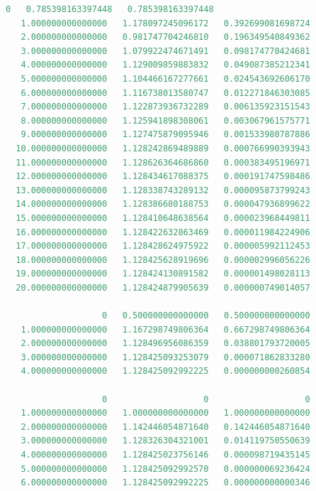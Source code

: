 \begin{lstlisting}[language = MATLAB]
                   0   0.785398163397448   0.785398163397448
   1.000000000000000   1.178097245096172   0.392699081698724
   2.000000000000000   0.981747704246810   0.196349540849362
   3.000000000000000   1.079922474671491   0.098174770424681
   4.000000000000000   1.129009859883832   0.049087385212341
   5.000000000000000   1.104466167277661   0.024543692606170
   6.000000000000000   1.116738013580747   0.012271846303085
   7.000000000000000   1.122873936732289   0.006135923151543
   8.000000000000000   1.125941898308061   0.003067961575771
   9.000000000000000   1.127475879095946   0.001533980787886
  10.000000000000000   1.128242869489889   0.000766990393943
  11.000000000000000   1.128626364686860   0.000383495196971
  12.000000000000000   1.128434617088375   0.000191747598486
  13.000000000000000   1.128338743289132   0.000095873799243
  14.000000000000000   1.128386680188753   0.000047936899622
  15.000000000000000   1.128410648638564   0.000023968449811
  16.000000000000000   1.128422632863469   0.000011984224906
  17.000000000000000   1.128428624975922   0.000005992112453
  18.000000000000000   1.128425628919696   0.000002996056226
  19.000000000000000   1.128424130891582   0.000001498028113
  20.000000000000000   1.128424879905639   0.000000749014057

                   0   0.500000000000000   0.500000000000000
   1.000000000000000   1.167298749806364   0.667298749806364
   2.000000000000000   1.128496956086359   0.038801793720005
   3.000000000000000   1.128425093253079   0.000071862833280
   4.000000000000000   1.128425092992225   0.000000000260854

                   0                   0                   0
   1.000000000000000   1.000000000000000   1.000000000000000
   2.000000000000000   1.142446054871640   0.142446054871640
   3.000000000000000   1.128326304321001   0.014119750550639
   4.000000000000000   1.128425023756146   0.000098719435145
   5.000000000000000   1.128425092992570   0.000000069236424
   6.000000000000000   1.128425092992225   0.000000000000346
\end{lstlisting}
